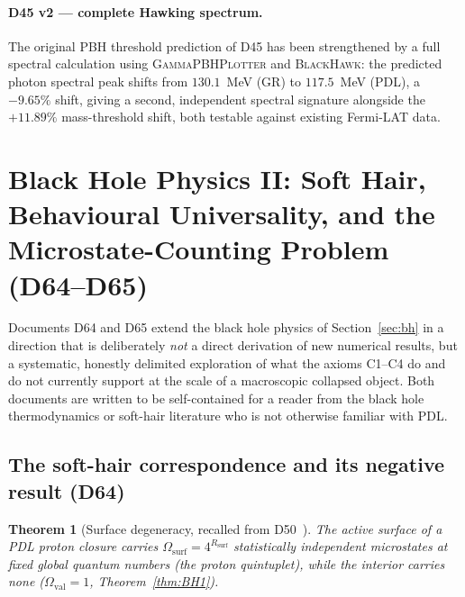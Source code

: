 \documentclass[11pt,a4paper]{article}
\theoremstyle{plain}
\newtheorem{theorem}{Theorem}[section]
\theoremstyle{definition}
\theoremstyle{remark}
\newcommand{\Rsurf}{R_{\mathrm{surf}}}
\begin{document}
\paragraph{D45 v2 --- complete Hawking spectrum.} The original PBH threshold prediction of D45 has been strengthened by a full spectral calculation using \textsc{GammaPBHPlotter} and \textsc{BlackHawk}: the predicted photon spectral peak shifts from $130.1$~MeV (GR) to $117.5$~MeV (PDL), a $-9.65\%$ shift, giving a second, independent spectral signature alongside the $+11.89\%$ mass-threshold shift, both testable against existing Fermi-LAT data.

\section{Black Hole Physics II: Soft Hair, Behavioural Universality, and the Microstate-Counting Problem (D64--D65)}
\label{sec:bh2}

Documents D64 and D65 extend the black hole physics of Section~\ref{sec:bh} in a direction that is deliberately \emph{not} a direct derivation of new numerical results, but a systematic, honestly delimited exploration of what the axioms C1--C4 do and do not currently support at the scale of a macroscopic collapsed object. Both documents are written to be self-contained for a reader from the black hole thermodynamics or soft-hair literature who is not otherwise familiar with PDL.

\subsection{The soft-hair correspondence and its negative result (D64)}
\label{subsec:softhair}

\begin{theorem}[Surface degeneracy, recalled from D50~\cite{D50}]
\label{thm:D50recall}
The active surface of a PDL proton closure carries $\Omega_{\mathrm{surf}} = 4^{\Rsurf}$ statistically independent microstates at fixed global quantum numbers (the proton quintuplet), while the interior carries none ($\Omega_{\mathrm{val}}=1$, Theorem~\ref{thm:BH1}).
\end{theorem}
\end{document}
